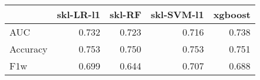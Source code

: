 \begin{tabular}{lrrrr}
\toprule
{} &  skl-LR-l1 &  skl-RF &  skl-SVM-l1 &  xgboost \\
\midrule
AUC      &      0.732 &   0.723 &       0.716 &    0.738 \\
Accuracy &      0.753 &   0.750 &       0.753 &    0.751 \\
F1w      &      0.699 &   0.644 &       0.707 &    0.688 \\
\bottomrule
\end{tabular}
